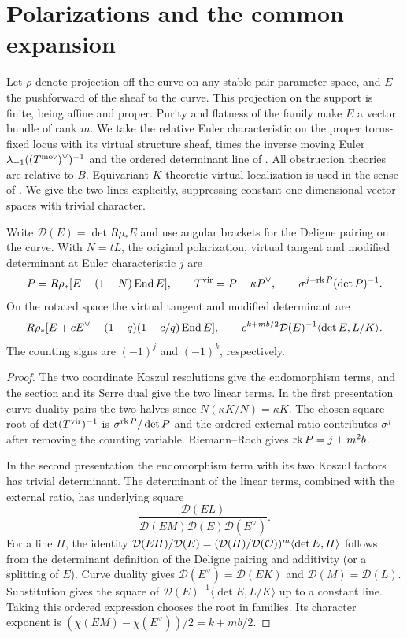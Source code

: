 \section{Polarizations and the common expansion}\label{sec:geometry}
Let $\rho$ denote projection off the curve on any stable-pair
parameter space, and $E$ the pushforward of the sheaf to the curve.
This projection on the support is finite, being affine and proper.
Purity and flatness of the family make $E$ a vector bundle of rank
$m$. We take the relative Euler characteristic on the proper torus-fixed
locus with its virtual structure sheaf, times the inverse moving
Euler $\lambda_{-1}((T^{\rm mov})^\vee)^{-1}$ and the ordered
determinant line of \cite{NO,W}. All obstruction theories are relative
to $B$. Equivariant $K$-theoretic virtual localization is used in the
sense of \cite{Q}. We give the two lines explicitly, suppressing
constant one-dimensional vector spaces with trivial character.

\begin{lemma}\label{lem:root}
Write $\mathcal D(E)=\det R\rho_*E$ and use angular brackets for the
Deligne pairing on the curve. With $N=tL$, the original polarization,
virtual tangent and modified determinant at Euler characteristic $j$
are
\[
 P=R\rho_*[E-(1-N)\operatorname{End} E],\qquad
 T^{\rm vir}=P-\kappa P^\vee,\qquad
 \sigma^{j+\operatorname{rk} P}(\det P)^{-1}.
\]
On the rotated space the virtual tangent and modified determinant are
\[
 R\rho_*[E+cE^\vee-(1-q)(1-c/q)\operatorname{End} E],\qquad
 c^{k+mb/2}\mathcal D(E)^{-1}\langle\det E,L/K\rangle .
\]
The counting signs are $(-1)^j$ and $(-1)^k$, respectively.
\end{lemma}
\begin{proof}
The two coordinate Koszul resolutions give the endomorphism terms,
and the section and its Serre dual give the two linear terms.
In the first presentation curve duality pairs the two halves since
$N(\kappa K/N)=\kappa K$. The chosen square root of
$\det(T^{\rm vir})^{-1}$ is $\sigma^{\operatorname{rk} P}/\det P$ and the ordered
external ratio contributes $\sigma^j$ after removing the counting
variable. Riemann--Roch gives $\operatorname{rk} P=j+m^2b$.

In the second presentation the endomorphism term with its two
Koszul factors has trivial determinant. The determinant of the
linear terms, combined with the external ratio, has underlying
square
\[
 \frac{\mathcal D(EL)}{\mathcal D(EM)\mathcal D(E)\mathcal D(E^\vee)}.
\]
For a line $H$, the identity
$\mathcal D(EH)/\mathcal D(E)=
 (\mathcal D(H)/\mathcal D(\mathcal O))^m\langle\det E,H\rangle$
follows from the determinant definition of the Deligne pairing and
additivity (or a splitting of $E$). Curve duality gives
$\mathcal D(E^\vee)=\mathcal D(EK)$ and
$\mathcal D(M)=\mathcal D(L)$. Substitution gives the square of
$\mathcal D(E)^{-1}\langle\det E,L/K\rangle$ up to a constant line.
Taking this ordered expression chooses the root in families. Its
character exponent is $(\chi(EM)-\chi(E^\vee))/2=k+mb/2$.
\end{proof}

